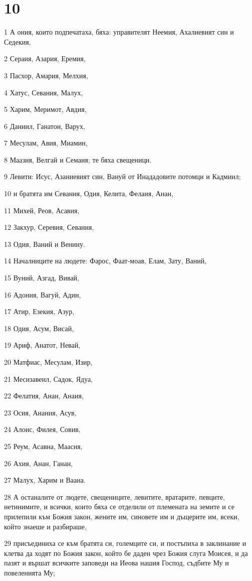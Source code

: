 \chapter{10}

\par 1 А ония, които подпечатаха, бяха: управителят Неемия, Ахалиевият син и Седекия,
\par 2 Сераия, Азария, Еремия,
\par 3 Пасхор, Амария, Мелхия,
\par 4 Хатус, Севания, Малух,
\par 5 Харим, Меримот, Авдия,
\par 6 Даниил, Ганатон, Варух,
\par 7 Месулам, Авия, Миамин,
\par 8 Маазия, Велгай и Семаия; те бяха свещеници.
\par 9 Левити: Исус, Азаниевият син, Вануй от Инададовите потомци и Кадмиил;
\par 10 и братята им Севания, Одия, Келита, Фелаия, Анан,
\par 11 Михей, Реов, Асавия,
\par 12 Закхур, Серевия, Севания,
\par 13 Одия, Ваний и Венину.
\par 14 Началниците на людете: Фарос, Фаат-моав, Елам, Зату, Ваний,
\par 15 Вуний, Азгад, Вивай,
\par 16 Адония, Вагуй, Адин,
\par 17 Атир, Езекия, Азур,
\par 18 Одия, Асум, Висай,
\par 19 Ариф, Анатот, Невай,
\par 20 Матфиас, Месулам, Изир,
\par 21 Месизавеил, Садок, Ядуа,
\par 22 Фелатия, Анан, Анаия,
\par 23 Осия, Анания, Асув,
\par 24 Алоис, Филея, Совив,
\par 25 Реум, Асавна, Маасия,
\par 26 Ахия, Анан, Ганан,
\par 27 Малух, Харим и Ваана.
\par 28 А останалите от людете, свещениците, левитите, вратарите, певците, нетинимите, и всички, които бяха се отделили от племената на земите и се прилепили към Божия закон, жените им, синовете им и дъщерите им, всеки, който знаеше и разбираше,
\par 29 присъединиха се към братята си, големците си, и постъпиха в заклинание и клетва да ходят по Божия закон, който бе даден чрез Божия слуга Моисея, и да пазят и вършат всичките заповеди на Иеова нашия Господ, съдбите Му и повеленията Му;
